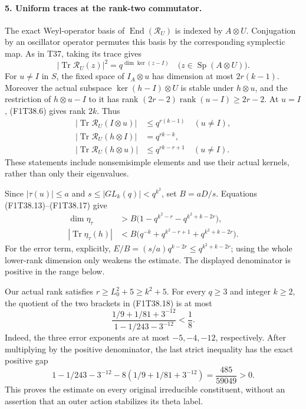 \paragraph{5. Uniform traces at the rank-two commutator.}
The exact Weyl-operator basis of
\(\operatorname{End}(\mathcal R_U)\) is indexed by
\(A\otimes U\). Conjugation by an oscillator operator
permutes this basis by the corresponding symplectic
map. As in T37, taking its trace gives
\[
 \bigl|\operatorname{Tr}\mathcal R_U(z)\bigr|^2
             =q^{\dim\ker(z-I)}
 \quad\bigl(z\in\operatorname{Sp}(A\otimes U)\bigr).
 \tag{F1T38.16}
\]
For \(u\ne I\) in \(S\), the fixed space of \(I_A\otimes u\)
has dimension at most \(2r(k-1)\). Moreover the actual
subspace \(\ker(h-I)\otimes U\) is stable under
\(h\otimes u\), and the restriction of \(h\otimes u-I\)
to it has rank
\((2r-2)\operatorname{rank}(u-I)\ge2r-2\).
At \(u=I\), (F1T38.6) gives rank \(2k\). Thus
\[
 \begin{split}
 |\operatorname{Tr}\mathcal R_U(I\otimes u)|
                 &\le q^{r(k-1)}\quad(u\ne I),\\
 |\operatorname{Tr}\mathcal R_U(h\otimes I)|
                 &=q^{rk-k},\\
 |\operatorname{Tr}\mathcal R_U(h\otimes u)|
                 &\le q^{rk-r+1}\quad(u\ne I).
 \end{split}
 \tag{F1T38.17}
\]
These statements include nonsemisimple elements and use
their actual kernels, rather than only their eigenvalues.

Since \(|\tau(u)|\le a\) and
\(s\le|GL_k(q)|<q^{k^2}\), set \(B=aD/s\). Equations
(F1T38.13)--(F1T38.17) give
\[
 \begin{split}
 \dim\eta_\tau
  &>B\bigl(1-q^{k^2-r}-q^{k^2+k-2r}\bigr),\\
 |\operatorname{Tr}\eta_\tau(h)|
  &<B\bigl(q^{-k}+q^{k^2-r+1}+q^{k^2+k-2r}\bigr).
 \end{split}
 \tag{F1T38.18}
\]
For the error term, explicitly,
\(E/B=(s/a)q^{k-2r}\le q^{k^2+k-2r}\);
using the whole lower-rank dimension only weakens the
estimate. The displayed denominator is positive in the
range below.

Our actual rank satisfies \(r\ge L_0^2+5\ge k^2+5\).
For every \(q\ge3\) and integer \(k\ge2\), the quotient
of the two brackets in (F1T38.18) is at most
\[
 \frac{1/9+1/81+3^{-12}}{1-1/243-3^{-12}}
                         <\frac18.
 \tag{F1T38.19}
\]
Indeed, the three error exponents are at most
\(-5,-4,-12\), respectively. After multiplying by the
positive denominator, the last strict inequality has
the exact positive gap
\[
 1-1/243-3^{-12}-8(1/9+1/81+3^{-12})
                         =\frac{485}{59049}>0.
 \tag{F1T38.20}
\]
This proves the estimate on every original irreducible
constituent, without an assertion that an outer action
stabilizes its theta label.

